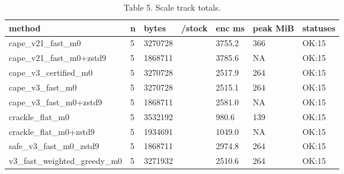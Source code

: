 \begin{table}[t]
\centering
\small
\caption{Table 5. Scale track totals.}
\begin{tabular}{lllllll}
\hline
method & n & bytes & /stock & enc ms & peak MiB & statuses \\
\hline
cape\_v21\_fast\_m0 & 5 & 3270728 &  & 3755.2 & 366 & OK:15 \\
cape\_v21\_fast\_m0+zstd9 & 5 & 1868711 &  & 3785.6 & NA & OK:15 \\
cape\_v3\_certified\_m0 & 5 & 3270728 &  & 2517.9 & 264 & OK:15 \\
cape\_v3\_fast\_m0 & 5 & 3270728 &  & 2515.1 & 264 & OK:15 \\
cape\_v3\_fast\_m0+zstd9 & 5 & 1868711 &  & 2581.0 & NA & OK:15 \\
crackle\_flat\_m0 & 5 & 3532192 &  & 980.6 & 139 & OK:15 \\
crackle\_flat\_m0+zstd9 & 5 & 1934691 &  & 1049.0 & NA & OK:15 \\
safe\_v3\_fast\_m0\_zstd9 & 5 & 1868711 &  & 2974.8 & 264 & OK:15 \\
v3\_fast\_weighted\_greedy\_m0 & 5 & 3271932 &  & 2510.6 & 264 & OK:15 \\
\hline
\end{tabular}
\end{table}
